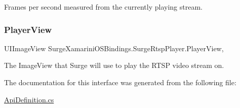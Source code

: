 Frames per second measured from the currently playing stream. 

\mbox{\label{interface_surge_xamarini_o_s_bindings_1_1_surge_rtsp_player_ab629f9303d6b427a8213e1dee03a3810}} 
\subsubsection{\texorpdfstring{Player\+View}{PlayerView}}
{\footnotesize\ttfamily U\+I\+Image\+View Surge\+Xamarini\+O\+S\+Bindings.\+Surge\+Rtsp\+Player.\+Player\+View\hspace{0.3cm}{\ttfamily [get]}, {\ttfamily [set]}}



The Image\+View that Surge will use to play the R\+T\+SP video stream on. 



The documentation for this interface was generated from the following file\+:\begin{DoxyCompactItemize}
\item 
\hyperlink{_api_definition_8cs}{Api\+Definition.\+cs}\end{DoxyCompactItemize}
